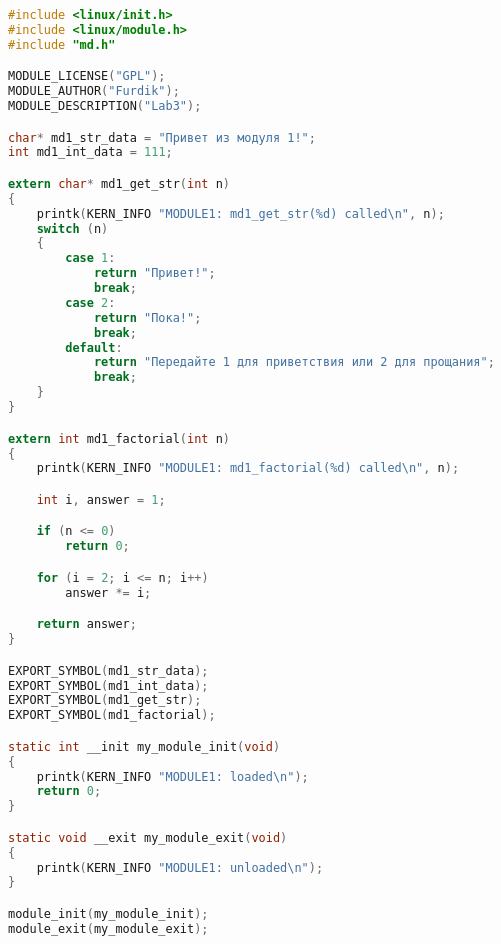 \begin{lstlisting}[language=c,caption=Листинг кода вызываемого модуля md1]
#include <linux/init.h>
#include <linux/module.h>
#include "md.h"

MODULE_LICENSE("GPL");
MODULE_AUTHOR("Furdik");
MODULE_DESCRIPTION("Lab3");

char* md1_str_data = "Привет из модуля 1!";
int md1_int_data = 111;

extern char* md1_get_str(int n)
{
	printk(KERN_INFO "MODULE1: md1_get_str(%d) called\n", n);
	switch (n)
	{
		case 1:
			return "Привет!";
			break;
		case 2:
			return "Пока!";
			break;
		default:
			return "Передайте 1 для приветствия или 2 для прощания";
			break;
	}
}

extern int md1_factorial(int n)
{
	printk(KERN_INFO "MODULE1: md1_factorial(%d) called\n", n);

	int i, answer = 1;

	if (n <= 0)
		return 0;

	for (i = 2; i <= n; i++)
		answer *= i;

	return answer;
}

EXPORT_SYMBOL(md1_str_data);
EXPORT_SYMBOL(md1_int_data);
EXPORT_SYMBOL(md1_get_str);
EXPORT_SYMBOL(md1_factorial);

static int __init my_module_init(void)
{
	printk(KERN_INFO "MODULE1: loaded\n");
	return 0;
}

static void __exit my_module_exit(void)
{
	printk(KERN_INFO "MODULE1: unloaded\n");
}

module_init(my_module_init);
module_exit(my_module_exit);

\end{lstlisting}

